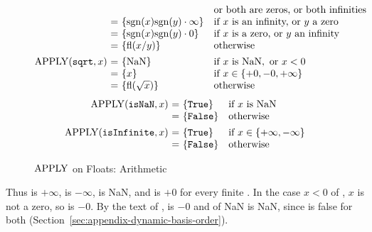 \begin{figure}[htbp]
\[\begin{array}{@{}r@{\ }c@{\ }l@{\quad}l@{}}
                      &   &             & \text{or both are zeros, or both infinities}\\
                      & = & \{\dbsgn(x)\dbsgn(y)\cdot\infty\} & \text{if}\ x\ \text{is an infinity,}\ \text{or}\ y\ \text{a zero}\\
                      & = & \{\dbsgn(x)\dbsgn(y)\cdot 0\} & \text{if}\ x\ \text{is a zero,}\ \text{or}\ y\ \text{an infinity}\\
                      & = & \{\dbfl(x/y)\} & \text{otherwise}\\[1ex]
\APPLY(\kw{sqrt},x) & = & \{\dbNaN\} & \text{if}\ x\ \text{is}\ \dbNaN,\ \text{or}\ x<0\\
                    & = & \{x\} & \text{if}\ x\in\{+0,-0,+\infty\}\\
                    & = & \{\dbfl(\sqrt{x})\} & \text{otherwise}
\end{array}
\]
\[
\begin{array}{@{}r@{\ }c@{\ }l@{\quad}l@{}}
\APPLY(\kw{isNaN},x) & = & \{\kw{True}\} & \text{if}\ x\ \text{is}\ \dbNaN\\
                     & = & \{\kw{False}\} & \text{otherwise}\\[1ex]
\APPLY(\kw{isInfinite},x) & = & \{\kw{True}\} & \text{if}\ x\in\{+\infty,-\infty\}\\
                          & = & \{\kw{False}\} & \text{otherwise}
\end{array}
\]
\caption{$\mathrm{APPLY}$ on Floats: Arithmetic}\label{fig:dynamic-basis-float}
\end{figure}

Thus  is $+\infty$,  is $-\infty$,  is NaN,
and  is $+0$ for every finite . In the case $x<0$ of
, $x$ is not a zero, so  is $-0$. By the text of
,  is $-0$ and  of NaN is NaN, since
 is false for both (Section~\ref{sec:appendix-dynamic-basis-order}).

